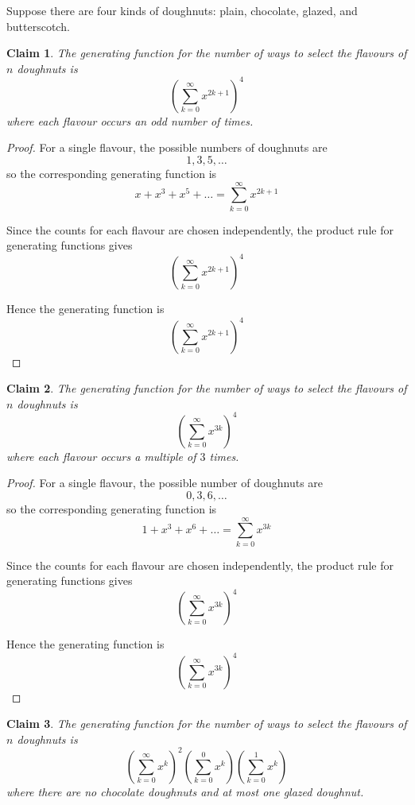 \documentclass{article}
\newtheorem{claim}{Claim}
\begin{document}
Suppose there are four kinds of doughnuts: plain, chocolate, glazed, and butterscotch. 

\begin{claim}
    The generating function for the number of ways to select the flavours of $n$ doughnuts is
    \[
    \left(\sum_{k=0}^{\infty}x^{2k+1}\right)^4
    \]
    where each flavour occurs an odd number of times.
\end{claim}

\begin{proof}
    For a single flavour, the possible numbers of doughnuts are
    \[
    1, 3, 5, \dots
    \]
    so the corresponding generating function is
    \[
    x + x^3 + x^5 + \dots = \sum_{k=0}^{\infty}x^{2k+1}
    \]

    \medskip

    Since the counts for each flavour are chosen independently, the product rule for 
    generating functions gives
    \[
    \left(\sum_{k=0}^{\infty}x^{2k+1}\right)^4
    \]

    \medskip

    Hence the generating function is
    \[
    \left(\sum_{k=0}^{\infty}x^{2k+1}\right)^4
    \]
\end{proof}

\begin{claim}
    The generating function for the number of ways to select the flavours of $n$ doughnuts is 
    \[
    \left(\sum_{k=0}^{\infty}x^{3k}\right)^4
    \]
    where each flavour occurs a multiple of $3$ times.
\end{claim}

\begin{proof}
    For a single flavour, the possible number of doughnuts are
    \[
    0, 3, 6, \dots
    \]
    so the corresponding generating function is
    \[
    1 + x^3 + x^6 + \dots = \sum_{k=0}^{\infty}x^{3k}
    \]

    \medskip

    Since the counts for each flavour are chosen independently, the product rule for
    generating functions gives
    \[
    \left(\sum_{k=0}^{\infty}x^{3k}\right)^4
    \]

    \medskip

    Hence the generating function is
    \[
    \left(\sum_{k=0}^{\infty}x^{3k}\right)^4
    \]
\end{proof}

\begin{claim}
    The generating function for the number of ways to select the flavours of $n$ doughnuts is 
    \[
    \left(\sum_{k=0}^{\infty}x^k\right)^2\left(\sum_{k=0}^{0}x^k\right)
    \left(\sum_{k=0}^{1}x^k\right)
    \]
    where there are no chocolate doughnuts and at most one glazed doughnut.
\end{claim}
\end{document}
